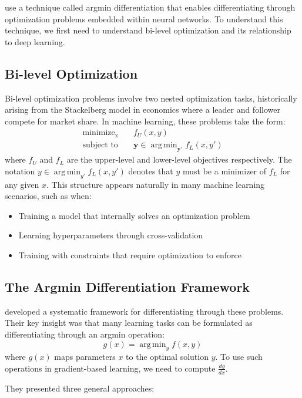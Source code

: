 \documentclass{article}
\DeclareMathOperator*{\argmin}{arg\,min}
\begin{document}
\citep{optnet} use a technique called argmin differentiation that enables differentiating through optimization problems embedded within neural networks. To understand this technique, we first need to understand bi-level optimization and its relationship to deep learning.

\subsection{Bi-level Optimization}
Bi-level optimization problems involve two nested optimization tasks, historically arising from the Stackelberg model in economics where a leader and follower compete for market share. In machine learning, these problems take the form:
\begin{align*}
    \mathrm{minimize_x}  \quad & f_U(x, y) \\
    \text{subject to} \quad & \mathbf{y} \in \argmin_{\mathbf{y'}} f_L(x,y')
\end{align*}
where $f_U$ and $f_L$ are the upper-level and lower-level objectives respectively. The notation $y \in \argmin_{y'} f_L(x,y')$ denotes that $y$ must be a minimizer of $f_L$ for any given $x$. This structure appears naturally in many machine learning scenarios, such as when:
\begin{itemize}
    \item Training a model that internally solves an optimization problem
    \item Learning hyperparameters through cross-validation
    \item Training with constraints that require optimization to enforce
\end{itemize}

\subsection{The Argmin Differentiation Framework}
\citep{gould2016differentiating} developed a systematic framework for differentiating through these problems. Their key insight was that many learning tasks can be formulated as differentiating through an argmin operation:
\begin{equation}
    g(x) = \argmin_y f(x,y)
\end{equation}
where $g(x)$ maps parameters $x$ to the optimal solution $y$. To use such operations in gradient-based learning, we need to compute $\frac{dg}{dx}$.

They presented three general approaches:
\end{document}
